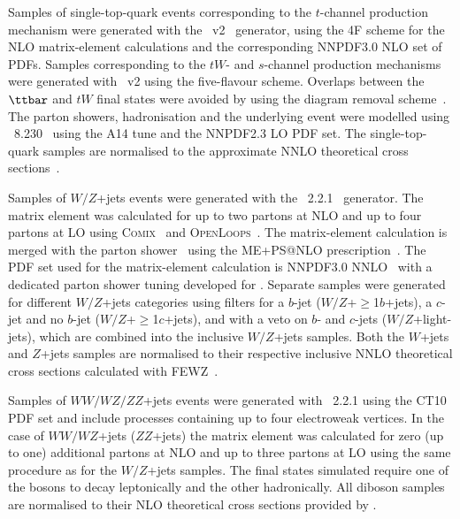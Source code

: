 Samples of single-top-quark events corresponding to the $t$-channel production mechanism were generated with the 
{\powheg}~v2~\cite{Frederix:2012dh} generator, using the 4F scheme  for the NLO matrix-element calculations
and the corresponding NNPDF3.0 NLO set of PDFs.
Samples corresponding to the $tW$- and $s$-channel production mechanisms were generated 
with {\powheg}~v2 using the five-flavour scheme. Overlaps between the $\ttbar$ and $tW$ final states were avoided by using 
the diagram removal scheme~\cite{Frixione:2005vw}.
The parton showers, hadronisation and the underlying event were modelled using {\pythia}~8.230~\cite{Sjostrand:2006za} using the A14 tune and the NNPDF2.3 LO PDF set.
The single-top-quark samples are normalised to the approximate NNLO theoretical cross 
sections~\cite{Kidonakis:2011wy,Kidonakis:2010ux,Kidonakis:2010tc}. 

Samples of $W/Z$+jets events were generated with the {\sherpa}~2.2.1~\cite{Gleisberg:2008ta} generator. 
The matrix element was calculated for up to two partons at NLO and up to four partons at LO using 
\textsc{Comix}~\cite{Gleisberg:2008fv} and \textsc{OpenLoops}~\cite{Cascioli:2011va}. The matrix-element calculation 
is merged with the {\sherpa} parton shower~\cite{Schumann:2007mg} using the ME+PS@NLO prescription~\cite{Hoeche:2012yf}. 
The PDF set used for the matrix-element calculation is NNPDF3.0 NNLO~\cite{Ball:2014uwa} with a dedicated parton shower tuning developed for {\sherpa}. 
Separate samples were generated for different $W/Z$+jets categories using filters for a $b$-jet 
($W/Z$+$\geq$1$b$+jets), a $c$-jet and no $b$-jet ($W/Z$+$\geq$1$c$+jets), and with a veto on $b$- and $c$-jets 
($W/Z$+light-jets), which are combined into the inclusive $W/Z$+jets samples.
Both the $W$+jets and $Z$+jets samples are normalised to their respective inclusive NNLO theoretical 
cross sections calculated with \textsc{FEWZ}~\cite{Anastasiou:2003ds}.

Samples of $WW/WZ/ZZ$+jets events were generated with {\sherpa}~2.2.1 using the CT10 PDF set
and include processes containing up to four electroweak vertices. 
In the case of $WW/WZ$+jets ($ZZ$+jets) the matrix element was calculated for zero (up to one) additional partons 
at NLO and up to three partons at LO using the same procedure as for the $W/Z$+jets samples. 
The final states simulated require one of the bosons to decay leptonically and the other hadronically.
All diboson samples are normalised to their NLO theoretical cross sections provided by {\sherpa}. 

